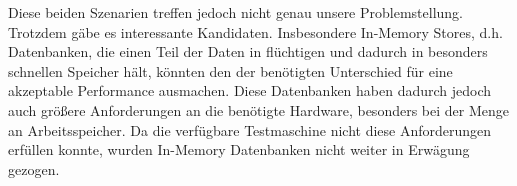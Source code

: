 Diese beiden Szenarien treffen jedoch nicht genau unsere Problemstellung. Trotzdem gäbe es interessante Kandidaten. Insbesondere In-Memory Stores, d.h. Datenbanken, die einen Teil der Daten in flüchtigen und dadurch in besonders schnellen Speicher hält, könnten den der benötigten Unterschied für eine akzeptable  Performance ausmachen. Diese Datenbanken haben dadurch jedoch auch größere Anforderungen an die benötigte Hardware, besonders bei der Menge an Arbeitsspeicher. 
Da die verfügbare Testmaschine nicht diese Anforderungen erfüllen konnte, wurden In-Memory Datenbanken nicht weiter in Erwägung gezogen.




 